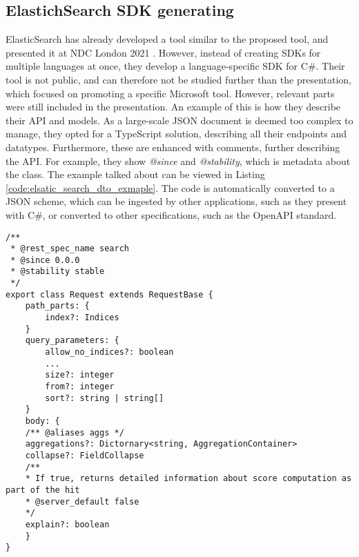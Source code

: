 \subsection*{ElastichSearch SDK generating}
ElasticSearch has already developed a tool similar to the proposed tool, and presented it at NDC London 2021 \cite{elastic-search-ndc}. However, instead of creating SDKs for multiple languages at once, they develop a language-specific SDK for C\#. Their tool is not public, and can therefore not be studied further than the presentation, which focused on promoting a specific Microsoft tool. However, relevant parts were still included in the presentation. An example of this is how they describe their API and models. As a large-scale JSON document is deemed too complex to manage, they opted for a TypeScript solution, describing all their endpoints and datatypes. Furthermore, these are enhanced with comments, further describing the API. For example, they show \textit{@since} and \textit{@stability}, which is metadata about the class. The example talked about can be viewed in Listing \ref{code:elsatic_search_dto_exmaple}. The code is automatically converted to a JSON scheme, which can be ingested by other applications, such as they present with C\#, or converted to other specifications, such as the OpenAPI standard.

{
\lstset{style=base_typescript}
\begin{lstlisting}[caption={ElasticSearch model definition}, label={code:elsatic_search_dto_exmaple}]
/**
 * @rest_spec_name search
 * @since 0.0.0
 * @stability stable
 */
export class Request extends RequestBase {
    path_parts: {
        index?: Indices
    }
    query_parameters: {
        allow_no_indices?: boolean
        ...
        size?: integer
        from?: integer
        sort?: string | string[]
    }
    body: {
    /** @aliases aggs */
    aggregations?: Dictornary<string, AggregationContainer>
    collapse?: FieldCollapse
    /** 
    * If true, returns detailed information about score computation as part of the hit
    * @server_default false
    */
    explain?: boolean
    }
}
\end{lstlisting}
}
